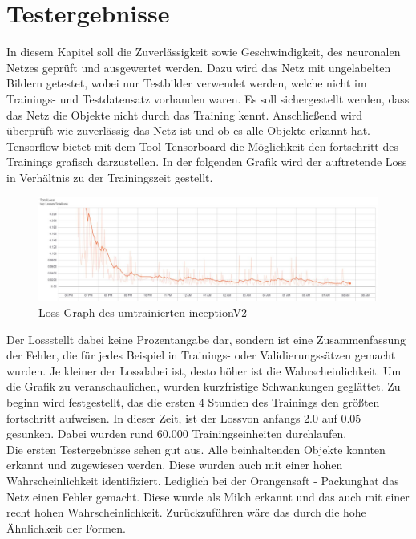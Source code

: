 \documentclass[a4paper,12pt,oneside]{article}
\begin{document}
\section{Testergebnisse}
In diesem Kapitel soll die Zuverlässigkeit sowie Geschwindigkeit, des neuronalen Netzes geprüft und ausgewertet werden. Dazu wird das Netz mit ungelabelten Bildern getestet, wobei nur Testbilder verwendet werden, welche nicht im Trainings- und Testdatensatz vorhanden waren. Es soll sichergestellt werden, dass das Netz die Objekte nicht durch das Training kennt. Anschließend wird überprüft wie zuverlässig das Netz ist und ob es alle Objekte erkannt hat. 
\\
Tensorflow bietet mit dem Tool Tensorboard die Möglichkeit den fortschritt des Trainings grafisch darzustellen. In der folgenden Grafik wird der auftretende \glqq Loss \glqq in Verhältnis zu der Trainingszeit gestellt. 
\\
\begin{figure}
    [h]
	\centering
	\includegraphics[scale=0.4]{Sources/loss_graph_200000.jpg}
	\caption{Loss Graph des umtrainierten inceptionV2}
	\label{img:loss_graph_200000}
\end{figure}

Der \glqq Loss\grqq stellt dabei keine Prozentangabe dar, sondern ist eine Zusammenfassung der Fehler, die für jedes Beispiel in Trainings- oder Validierungssätzen gemacht wurden. Je kleiner der \glqq Loss\grqq dabei ist, desto höher ist die Wahrscheinlichkeit. Um die Grafik zu veranschaulichen, wurden kurzfristige Schwankungen geglättet. Zu beginn wird festgestellt, das die ersten 4 Stunden des Trainings den größten fortschritt aufweisen. In dieser Zeit, ist der \glqq Loss\grqq von anfangs 2.0 auf 0.05 gesunken. Dabei wurden rund 60.000 Trainingseinheiten durchlaufen.\\
Die ersten Testergebnisse sehen gut aus. Alle beinhaltenden Objekte konnten erkannt und zugewiesen werden. Diese wurden auch mit einer hohen Wahrscheinlichkeit identifiziert. Lediglich bei der \glqq Orangensaft - Packung\grqq hat das Netz einen Fehler gemacht. Diese wurde als Milch erkannt und das auch mit einer recht hohen Wahrscheinlichkeit. Zurückzuführen wäre das durch die hohe Ähnlichkeit der Formen.
\\
\end{document}
